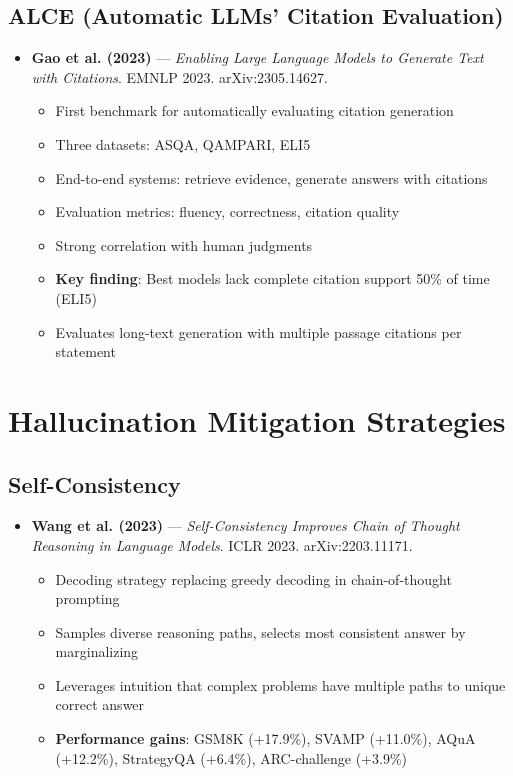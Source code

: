 \documentclass[11pt,letterpaper]{article}
\begin{document}
\subsection{ALCE (Automatic LLMs' Citation Evaluation)}

\begin{itemize}[leftmargin=*]
\item \textbf{Gao et al. (2023)} --- \textit{Enabling Large Language Models to Generate Text with Citations}. EMNLP 2023. arXiv:2305.14627.
  \begin{itemize}
  \item First benchmark for automatically evaluating citation generation
  \item Three datasets: ASQA, QAMPARI, ELI5
  \item End-to-end systems: retrieve evidence, generate answers with citations
  \item Evaluation metrics: fluency, correctness, citation quality
  \item Strong correlation with human judgments
  \item \textbf{Key finding}: Best models lack complete citation support 50\% of time (ELI5)
  \item Evaluates long-text generation with multiple passage citations per statement
  \end{itemize}
\end{itemize}

\section{Hallucination Mitigation Strategies}

\subsection{Self-Consistency}

\begin{itemize}[leftmargin=*]
\item \textbf{Wang et al. (2023)} --- \textit{Self-Consistency Improves Chain of Thought Reasoning in Language Models}. ICLR 2023. arXiv:2203.11171.
  \begin{itemize}
  \item Decoding strategy replacing greedy decoding in chain-of-thought prompting
  \item Samples diverse reasoning paths, selects most consistent answer by marginalizing
  \item Leverages intuition that complex problems have multiple paths to unique correct answer
  \item \textbf{Performance gains}: GSM8K (+17.9\%), SVAMP (+11.0\%), AQuA (+12.2\%), StrategyQA (+6.4\%), ARC-challenge (+3.9\%)
  \end{itemize}
\end{itemize}
\end{document}
